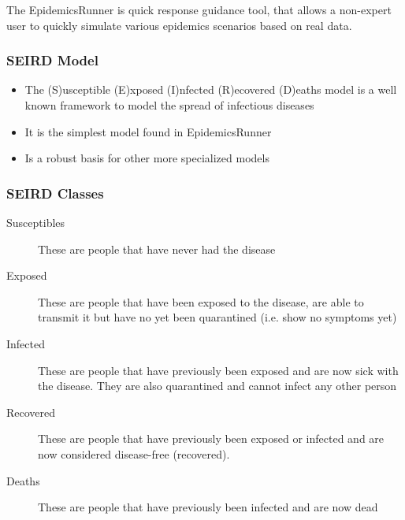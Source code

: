\documentclass{beamer}
\begin{document}
\begin{frame}
The EpidemicsRunner is quick response guidance tool, that allows a non-expert user to quickly
simulate various epidemics scenarios based on real data.

\end{frame}

\begin{frame}
	\frametitle{SEIRD Model}
	\begin{itemize}
		\item The (S)usceptible (E)xposed (I)nfected (R)ecovered (D)eaths model is a well known framework to model the spread of infectious diseases		
		\item  It is the simplest model found in EpidemicsRunner \\\vspace{0.1cm}
	       	
                \item Is a robust basis for other more specialized models	\\\vspace{0.3cm}

	\end{itemize}
\end{frame}

\begin{frame}
	\frametitle{SEIRD Classes}
	\begin{description}
		\item[Susceptibles]
	        These are people that have never had the disease
 			
		\item[Exposed]
	       	These are people that have been exposed to the disease, are able to transmit it
                but have no yet been quarantined (i.e. show no symptoms yet)

                \item[Infected]
                These are people that have previously been exposed and are now sick with the disease.
                They are also quarantined and cannot infect any other person

               \item[Recovered]
                These are people that have previously been exposed or infected and are now  considered disease-free (recovered). 

               \item[Deaths]
                These are people that have previously been infected and are now dead

	\end{description}

\end{frame}
\end{document}
